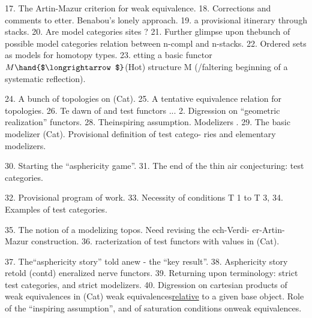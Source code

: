 17.  The Artin-Mazur  criterion for weak equivalence.
18.  Corrections and comments to etter.  Benabou's lonely approach.
19.   a provisional itinerary \hand{(}through stacks\hand{)}. \margin{\rule{2cm}{0.4pt}}
20.  Are model categories sites ?
21.  Further glimpse upon thebunch of possible model categories\hand{;} 
relation between n-compl and n-stacks.
22.  Ordered sets as models for homotopy types.
\margin{$\bigcirc$}23.  etting a basic functor  $M \hand{$\longrightarrow$}$(Hot)    structure M
(/faltering beginning of a systematic reflection). \margin{\rule{2cm}{0.4pt}}

24.  A bunch of topologies on (Cat).
25.  A tentative equivalence relation for topologies.
26.  Te dawn of   and test functors ...
2.  Digression on ``geometric realization'' functors. \margin{\rule{2cm}{0.4pt}}
\margin{$\bigcirc$}28.  Theinspiring assumption.  Modelizers .
29.  The basic modelizer (Cat).  Provisional definition of test catego-%
ries and elementary modelizers. \margin{\rule{2cm}{0.4pt}}

30.  Starting  the ``asphericity game''.
\margin{$\bigcirc$}31.  The end of the thin air conjecturing:   test
categories. \margin{\rule{2cm}{0.4pt}}

\margin{$\downarrow$}32.  Provisional program of work.
\margin{$\bigcirc$}33.  Necessity of conditions T 1 to T 3, 
34.  Examples of test categories. \margin{\rule{2cm}{0.4pt}}

35.  The notion of a modelizing topos.   Need revising the ech-Verdi-%
er-Artin-Mazur construction.
36.  racterization of test functors with values in (Cat). \margin{\rule{2cm}{0.4pt}}

\margin{$\bigcirc$}37.  The``asphericity story'' told anew  -  the ``key result''.  \margin{\rule{2cm}{0.4pt}}
38.  Asphericity story retold (contd)\hand{:} eneralized nerve functors.
39.  Returning upon terminology:  strict test categories, and strict
modelizers.
40.  Digression on cartesian products of weak equivalences in (Cat)\hand{;}
\hand{\unsure{\&}}  weak equivalences\uline{relative} to a given base object.
  Role of the ``inspiring assumption'',  and of saturation conditions
onweak equivalences. \margin{\rule{2cm}{0.4pt}}

